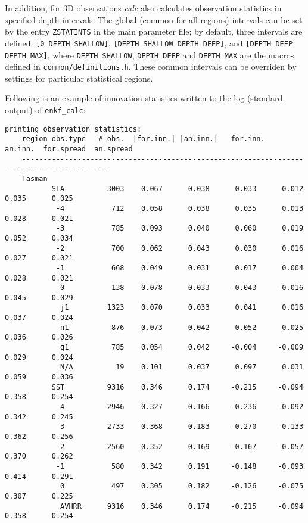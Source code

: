 \documentclass[11pt]{report}
\begin{document}
In addition, for 3D observations \emph{calc} also calculates observation statistics in specified depth intervals.
The global (common for all regions) intervals can be set by the entry \verb|ZSTATINTS| in the main parameter file; by default, three intervals are defined: \verb|[0 DEPTH_SHALLOW]|, \verb|[DEPTH_SHALLOW DEPTH_DEEP]|, and \verb|[DEPTH_DEEP DEPTH_MAX]|, where \verb|DEPTH_SHALLOW|, \verb|DEPTH_DEEP| and \verb|DEPTH_MAX| are the macros defined in \verb|common/definitions.h|.
These common intervals can be overriden by settings for particular statistical regions.

Following is an example of innovation statistics written to the log (standard output) of \verb|enkf_calc|:
\begin{Verbatim}[frame=single,fontsize=\footnotesize]
  printing observation statistics:
    region obs.type   # obs.  |for.inn.| |an.inn.|   for.inn.   an.inn.  for.spread  an.spread
    ------------------------------------------------------------------------------------------
    Tasman
           SLA          3003    0.067      0.038      0.033      0.012      0.035      0.025  
            -4           712    0.058      0.038      0.035      0.013      0.028      0.021  
            -3           785    0.093      0.040      0.060      0.019      0.052      0.034  
            -2           700    0.062      0.043      0.030      0.016      0.027      0.021  
            -1           668    0.049      0.031      0.017      0.004      0.028      0.021  
             0           138    0.078      0.033     -0.043     -0.016      0.045      0.029  
             j1         1323    0.070      0.033      0.041      0.016      0.037      0.024  
             n1          876    0.073      0.042      0.052      0.025      0.036      0.026  
             g1          785    0.054      0.042     -0.004     -0.009      0.029      0.024  
             N/A          19    0.101      0.037      0.097      0.031      0.059      0.036  
           SST          9316    0.346      0.174     -0.215     -0.094      0.358      0.254  
            -4          2946    0.327      0.166     -0.236     -0.092      0.342      0.245  
            -3          2733    0.368      0.183     -0.270     -0.133      0.362      0.256  
            -2          2560    0.352      0.169     -0.167     -0.057      0.370      0.262  
            -1           580    0.342      0.191     -0.148     -0.093      0.414      0.291  
             0           497    0.305      0.182     -0.126     -0.075      0.307      0.225  
             AVHRR      9316    0.346      0.174     -0.215     -0.094      0.358      0.254  

\end{Verbatim}
\end{document}
